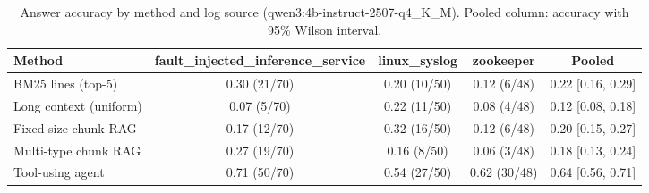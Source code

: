 \begin{table}[t]
\centering
\caption{Answer accuracy by method and log source (qwen3:4b-instruct-2507-q4_K_M). Pooled column: accuracy with 95\% Wilson interval.}
\label{tab:main_comparison__qwen3_4b_instruct}
\begin{tabular}{@{}lcccc@{}}
\toprule
Method & fault\_injected\_inference\_service & linux\_syslog & zookeeper & Pooled \\
\midrule
BM25 lines (top-5) & 0.30 (21/70) & 0.20 (10/50) & 0.12 (6/48) & 0.22 [0.16, 0.29] \\
Long context (uniform) & 0.07 (5/70) & 0.22 (11/50) & 0.08 (4/48) & 0.12 [0.08, 0.18] \\
Fixed-size chunk RAG & 0.17 (12/70) & 0.32 (16/50) & 0.12 (6/48) & 0.20 [0.15, 0.27] \\
Multi-type chunk RAG & 0.27 (19/70) & 0.16 (8/50) & 0.06 (3/48) & 0.18 [0.13, 0.24] \\
Tool-using agent & 0.71 (50/70) & 0.54 (27/50) & 0.62 (30/48) & 0.64 [0.56, 0.71] \\
\bottomrule
\end{tabular}
\end{table}
